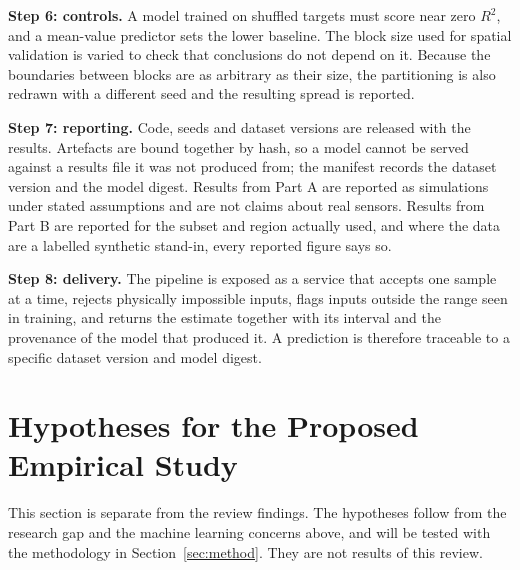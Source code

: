 \documentclass[conference]{IEEEtran}
\begin{document}
\noindent\textbf{Step 6: controls.} A model trained on shuffled targets must score
near zero $R^2$, and a mean-value predictor sets the lower baseline. The block
size used for spatial validation is varied to check that conclusions do not
depend on it.
Because the boundaries between blocks are as arbitrary as their size, the
partitioning is also redrawn with a different seed and the resulting spread is
reported.

\noindent\textbf{Step 7: reporting.} Code, seeds and dataset versions are released
with the results. Artefacts are bound together by hash, so a model cannot be
served against a results file it was not produced from; the manifest records the
dataset version and the model digest. Results from Part A are reported as
simulations under stated assumptions and are not claims about real sensors.
Results from Part B are reported for the subset and region actually used, and
where the data are a labelled synthetic stand-in, every reported figure says so.

\noindent\textbf{Step 8: delivery.} The pipeline is exposed as a service that
accepts one sample at a time, rejects physically impossible inputs, flags inputs
outside the range seen in training, and returns the estimate together with its
interval and the provenance of the model that produced it. A prediction is
therefore traceable to a specific dataset version and model digest.

\section{Hypotheses for the Proposed Empirical Study}\label{sec:hyp}
This section is separate from the review findings. The hypotheses follow from the
research gap and the machine learning concerns above, and will be tested with the
methodology in Section~\ref{sec:method}. They are not results of this review.
\end{document}
